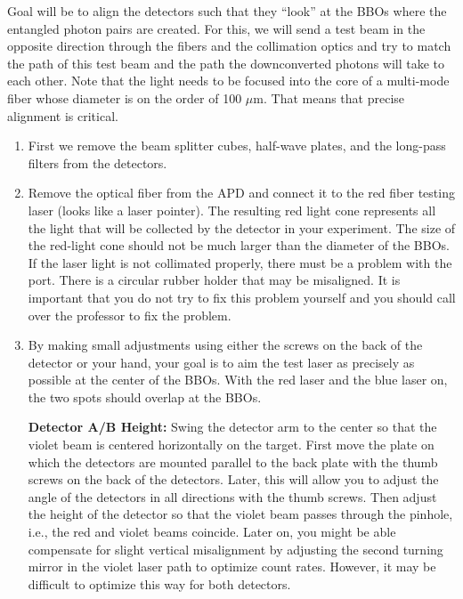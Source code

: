\documentclass{../lab}
\begin{document}
Goal will be to align the detectors such that they ``look'' at the BBOs where the entangled photon pairs are created. For this, we will send a test beam in the opposite direction through the fibers and the collimation optics and try to match the path of this test beam and the path the downconverted photons will take to each other. Note that the light needs to be focused into the core of a multi-mode fiber whose diameter is on the order of 100 $\mu$m. That means that precise alignment is critical.

\begin{enumerate}
    \item First we remove the beam splitter cubes, half-wave plates, and the long-pass filters from the detectors.

    \item Remove the optical fiber from the APD and connect it to the red fiber testing laser (looks like a laser pointer). The resulting red light cone represents all the light that will be collected by the detector in your experiment. The size of the red-light cone should not be much larger than the diameter of the BBOs. If the laser light is not collimated properly, there must be a problem with the port. There is a circular rubber holder that may be misaligned. It is important that you do not try to fix this problem yourself and you should call over the professor to fix the problem.

    \item By making small adjustments using either the screws on the back of the detector or your hand, your goal is to aim the test laser as precisely  as possible at the center of the BBOs. With the red laser and the blue laser on, the two spots should overlap at the BBOs.
    
    \textbf{Detector A/B Height:} Swing the detector arm to the center so that the violet beam is centered horizontally on the target. First move the plate on which the detectors are mounted parallel to the back plate with the thumb screws on the back of the detectors. Later, this will allow you to adjust the angle of the detectors in all directions with the thumb screws. Then adjust the height of the detector so that the violet beam passes through the pinhole, i.e., the red and violet beams coincide. Later on, you might be able compensate for slight vertical misalignment by adjusting the second turning mirror in the violet laser path to optimize count rates. However, it may be difficult to optimize this way for both detectors.
    

\end{enumerate}
\end{document}
